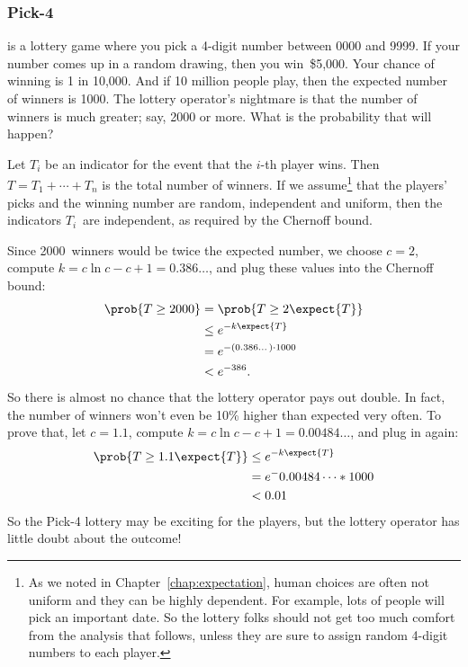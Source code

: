 \subsubsection{Pick-4}

 is a lottery game where you pick a 4-digit number between
0000 and 9999.  If your number comes up in a random drawing, then you
win~\$5,000.  Your chance of winning is 1 in 10,000.  And if 10
million people play, then the expected number of winners is 1000.  The
lottery operator's nightmare is that the number of winners is much
greater; say, 2000 or more.  What is the probability that will happen?

Let $T_i$ be an indicator for the event that the $i$-th player wins.
Then $T = T_1 + \cdots + T_n$ is the total number of winners.  If we
assume\footnote{As we noted in Chapter~\ref{chap:expectation}, human
  choices are often not uniform and they can be highly dependent.  For
  example, lots of people will pick an important date.  So the lottery
  folks should not get too much comfort from the analysis that
  follows, unless they are sure to assign random 4-digit numbers to
  each player.} that the players' picks and the winning number are
random, independent and uniform, then the indicators $T_i$~are
independent, as required by the Chernoff bound.


Since 2000~winners would be twice the expected number, we choose $c =
2$, compute $k = c \ln c - c + 1 = 0.386\dots$, and plug these values
into the Chernoff bound:
\begin{align*}
\prob{T \geq 2000} & = \prob{T \geq 2 \expect{T}} \\
  & \leq e^{-k \expect{T}} \\
  & = e^{- (0.386\dots) \cdot 1000} \\
  & < e^{-386}.
\end{align*}
So there is almost no chance that the lottery operator pays out
double.  In fact, the number of winners won't even be 10\% higher than
expected very often.  To prove that, let $c = 1.1$, compute $k = c \ln
c - c + 1 = 0.00484\dots$, and plug in again:
\begin{align*}
\prob{T \geq 1.1 \expect{T}} & \leq e^{-k \expect{T}} \\
  & = e^- 0.00484\dots * 1000 \\
  & < 0.01
\end{align*}
So the Pick-4 lottery may be exciting for the players, but the lottery
operator has little doubt about the outcome!

